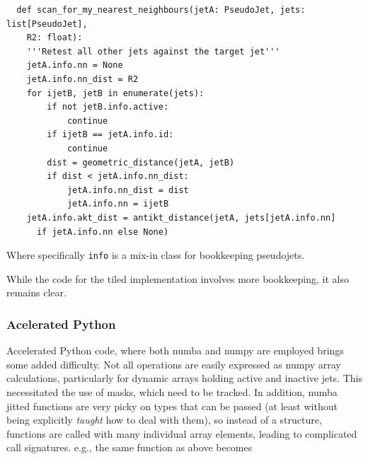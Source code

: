 \documentclass{webofc}
\begin{document}
\begin{verbatim}
  def scan_for_my_nearest_neighbours(jetA: PseudoJet, jets: list[PseudoJet], 
    R2: float):
    '''Retest all other jets against the target jet'''
    jetA.info.nn = None
    jetA.info.nn_dist = R2
    for ijetB, jetB in enumerate(jets):
        if not jetB.info.active:
            continue
        if ijetB == jetA.info.id:
            continue
        dist = geometric_distance(jetA, jetB)
        if dist < jetA.info.nn_dist:
            jetA.info.nn_dist = dist
            jetA.info.nn = ijetB
    jetA.info.akt_dist = antikt_distance(jetA, jets[jetA.info.nn] 
      if jetA.info.nn else None)
\end{verbatim}

Where specifically \texttt{info} is a mix-in class for bookkeeping pseudojets.

While the code for the tiled implementation involves more bookkeeping, it also remains clear.

\subsubsection{Acelerated Python}

Accelerated Python code, where both numba and numpy are employed brings some
added difficulty. Not all operations are easily expressed as numpy array
calculations, particularly for dynamic arrays holding active and inactive jets.
This necessitated the use of masks, which need to be tracked. In addition, numba
jitted functions are very picky on types that can be passed (at least without
being explicitly \emph{taught} how to deal with them), so instead of a
structure, functions are called with many individual array elements, leading to
complicated call signatures. e.g., the same function as above becomes
\end{document}
